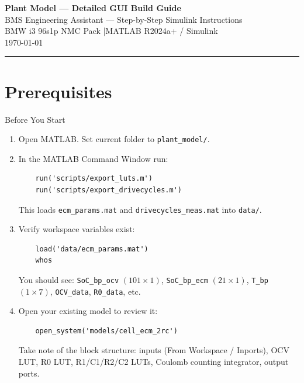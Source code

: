 \documentclass[11pt,a4paper]{article}
\begin{document}
\begin{center}
    {\LARGE\bfseries Plant Model — Detailed GUI Build Guide}\\[6pt]
    {\large BMS Engineering Assistant — Step-by-Step Simulink Instructions}\\[4pt]
    {\normalsize BMW i3 96s1p NMC Pack \quad|\quad MATLAB R2024a+ / Simulink}\\[10pt]
    \today
\end{center}

\vspace{4pt}
\noindent\rule{\textwidth}{0.8pt}

\tableofcontents
\newpage

\section*{Prerequisites}

\begin{guistep}{Before You Start}
\begin{enumerate}
    \item Open MATLAB. Set current folder to \texttt{plant\_model/}.
    \item In the MATLAB Command Window run:
    \begin{verbatim}
    run('scripts/export_luts.m')
    run('scripts/export_drivecycles.m')
    \end{verbatim}
    This loads \texttt{ecm\_params.mat} and \texttt{drivecycles\_meas.mat} into \texttt{data/}.
    \item Verify workspace variables exist:
    \begin{verbatim}
    load('data/ecm_params.mat')
    whos
    \end{verbatim}
    You should see: \texttt{SoC\_bp\_ocv} $(101\!\times\!1)$, \texttt{SoC\_bp\_ecm} $(21\!\times\!1)$, \texttt{T\_bp} $(1\!\times\!7)$, \texttt{OCV\_data}, \texttt{R0\_data}, etc.
    \item Open your existing model to review it:
    \begin{verbatim}
    open_system('models/cell_ecm_2rc')
    \end{verbatim}
    Take note of the block structure: inputs (From Workspace / Inports), OCV LUT, R0 LUT, R1/C1/R2/C2 LUTs, Coulomb counting integrator, output ports.
\end{enumerate}
\end{guistep}
\end{document}
